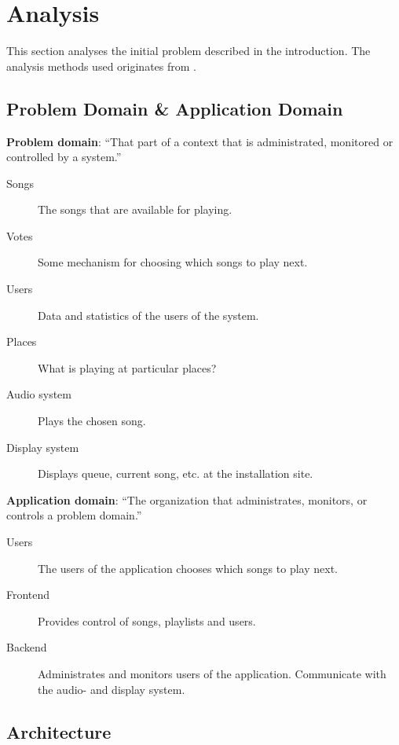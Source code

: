 \chapter{Analysis}

This section analyses the initial problem described in the introduction. The analysis methods used originates from \cite{mathiassen2001objektorienteret}. 

\section{Problem Domain \& Application Domain}


\textbf{Problem domain}: \enquote{That part of a context that is administrated, monitored or controlled by a system.}

\begin{description}
  \item[Songs] The songs that are available for playing.
  \item[Votes] Some mechanism for choosing which songs to play next.
  \item[Users] Data and statistics of the users of the system.
  \item[Places] What is playing at particular places?
  \item[Audio system] Plays the chosen song.
  \item[Display system] Displays queue, current song, etc. at the installation site.
\end{description}

\textbf{Application domain}: \enquote{The organization that administrates, monitors, or controls a problem domain.}

\begin{description}
  \item[Users] The users of the application chooses which songs to play next.
  \item[Frontend] Provides control of songs, playlists and users.
  \item[Backend] Administrates and monitors users of the application. Communicate with the audio- and display system.
\end{description}

\section{Architecture}
\label{sec:architecture}


